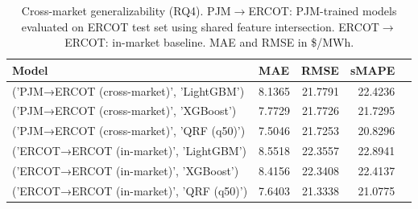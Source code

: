 \begin{table}[htbp]
\centering
\small
\caption{Cross-market generalizability (RQ4). PJM$\to$ERCOT: PJM-trained models evaluated on ERCOT test set using shared feature intersection. ERCOT$\to$ERCOT: in-market baseline. MAE and RMSE in \$/MWh.}
\label{tab:crossmarket}
\begin{tabular}{llrrr}
\toprule
Model & MAE & RMSE & sMAPE \\
\midrule
('PJM→ERCOT (cross-market)', 'LightGBM') & 8.1365 & 21.7791 & 22.4236 \\
('PJM→ERCOT (cross-market)', 'XGBoost') & 7.7729 & 21.7726 & 21.7295 \\
('PJM→ERCOT (cross-market)', 'QRF (q50)') & 7.5046 & 21.7253 & 20.8296 \\
('ERCOT→ERCOT (in-market)', 'LightGBM') & 8.5518 & 22.3557 & 22.8941 \\
('ERCOT→ERCOT (in-market)', 'XGBoost') & 8.4156 & 22.3408 & 22.4137 \\
('ERCOT→ERCOT (in-market)', 'QRF (q50)') & 7.6403 & 21.3338 & 21.0775 \\
\bottomrule
\end{tabular}
\end{table}